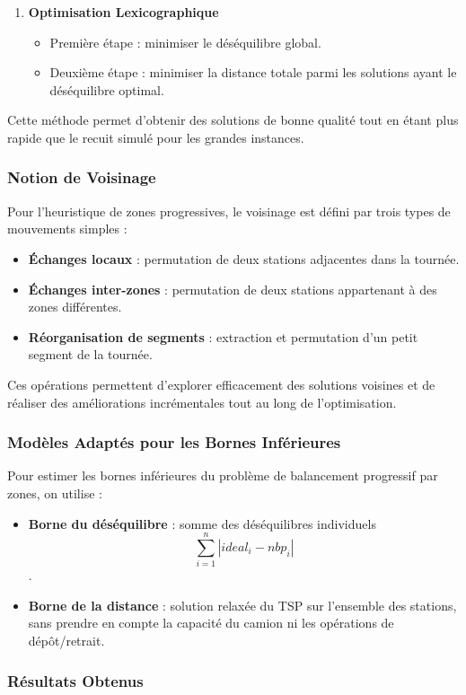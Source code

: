 \documentclass{article}
\begin{document}
\begin{enumerate}
  \item \textbf{Optimisation Lexicographique}
    \begin{itemize}
      \item Première étape : minimiser le déséquilibre global.
      \item Deuxième étape : minimiser la distance totale parmi les solutions ayant le déséquilibre optimal.
    \end{itemize}
\end{enumerate}

Cette méthode permet d'obtenir des solutions de bonne qualité tout en étant plus rapide que le recuit simulé pour les grandes instances.

\subsubsection{Notion de Voisinage}
Pour l’heuristique de zones progressives, le voisinage est défini par trois types de mouvements simples :
\begin{itemize}
  \item \textbf{Échanges locaux} : permutation de deux stations adjacentes dans la tournée.
  \item \textbf{Échanges inter-zones} : permutation de deux stations appartenant à des zones différentes.
  \item \textbf{Réorganisation de segments} : extraction et permutation d’un petit segment de la tournée.
\end{itemize}
Ces opérations permettent d’explorer efficacement des solutions voisines et de réaliser des améliorations incrémentales tout au long de l’optimisation.

\subsubsection{Modèles Adaptés pour les Bornes Inférieures}
Pour estimer les bornes inférieures du problème de balancement progressif par zones, on utilise :
\begin{itemize}
  \item \textbf{Borne du déséquilibre} : somme des déséquilibres individuels
  \[\sum_{i=1}^n |ideal_i - nbp_i|\].
  \item \textbf{Borne de la distance} : solution relaxée du TSP sur l’ensemble des stations, sans prendre en compte la capacité du camion ni les opérations de dépôt/retrait.
\end{itemize}

\subsubsection{Résultats Obtenus}
\end{document}
